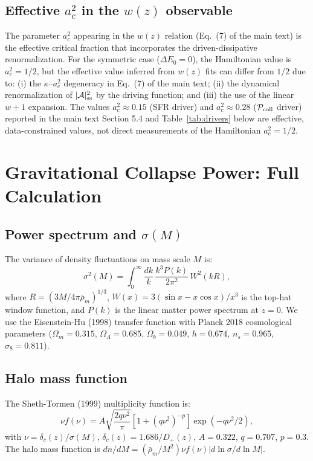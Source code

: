 \documentclass[aps,prd,onecolumn]{revtex4-2}
\begin{document}
\subsection{Effective $a_c^2$ in the $w(z)$ observable}

The parameter $a_c^2$ appearing in the $w(z)$ relation (Eq.~(7) of the main text) is the effective critical fraction that incorporates the driven-dissipative renormalization. For the symmetric case ($\Delta E_0 = 0$), the Hamiltonian value is $a_c^2 = 1/2$, but the effective value inferred from $w(z)$ fits can differ from $1/2$ due to: (i) the $\kappa$--$a_c^2$ degeneracy in Eq.~(7) of the main text; (ii) the dynamical renormalization of $|\mathcal{A}|^2_{\rm ss}$ by the driving function; and (iii) the use of the linear $w+1$ expansion. The values $a_c^2 \approx 0.15$ (SFR driver) and $a_c^2 \approx 0.28$ ($\mathcal{P}_{\rm coll}$ driver) reported in the main text Section 5.4 and Table~\ref{tab:drivers} below are effective, data-constrained values, not direct measurements of the Hamiltonian $a_c^2 = 1/2$.

\section{Gravitational Collapse Power: Full Calculation}

\subsection{Power spectrum and $\sigma(M)$}

The variance of density fluctuations on mass scale $M$ is:
\begin{equation}
\sigma^2(M) = \int_0^\infty \frac{dk}{k} \, \frac{k^3 P(k)}{2\pi^2} \, W^2(kR),
\label{sm:sigma}
\end{equation}
where $R = (3M/4\pi\bar{\rho}_m)^{1/3}$, $W(x) = 3(\sin x - x\cos x)/x^3$ is the top-hat window function, and $P(k)$ is the linear matter power spectrum at $z=0$. We use the Eisenstein-Hu (1998) transfer function with Planck 2018 cosmological parameters ($\Omega_m = 0.315$, $\Omega_\Lambda = 0.685$, $\Omega_b = 0.049$, $h = 0.674$, $n_s = 0.965$, $\sigma_8 = 0.811$).

\subsection{Halo mass function}

The Sheth-Tormen (1999) multiplicity function is:
\begin{equation}
\nu f(\nu) = A\sqrt{\frac{2q\nu^2}{\pi}}\left[1 + (q\nu^2)^{-p}\right]\exp(-q\nu^2/2),
\label{sm:mult}
\end{equation}
with $\nu = \delta_c(z)/\sigma(M)$, $\delta_c(z) = 1.686/D_+(z)$, $A = 0.322$, $q = 0.707$, $p = 0.3$. The halo mass function is $dn/dM = (\bar{\rho}_m/M^2) \nu f(\nu) |d\ln\sigma/d\ln M|$.
\end{document}
